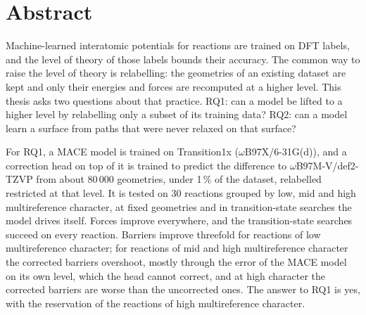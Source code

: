 
\section*{Abstract}

Machine-learned interatomic potentials for reactions are trained on DFT
labels, and the level of theory of those labels bounds their accuracy.
The common way to raise the level of theory is relabelling: the geometries of an
existing dataset are kept and only their energies and forces are
recomputed at a higher level. This thesis asks two questions about
that practice. RQ1: can a model be lifted to a higher level by
relabelling only a subset of its training data? RQ2: can a model learn
a surface from paths that were never relaxed on that surface?

For RQ1, a MACE model is trained on Transition1x
(\mbox{$\omega$B97X/6-31G(d)}), and a correction head on top of it
is trained to predict the difference to \mbox{$\omega$B97M-V/def2-TZVP}
from about 80\,000 geometries, under 1\,\% of the dataset, relabelled
restricted at that level. It is tested on 30 reactions grouped by low, mid and high
multireference character, at fixed geometries and in transition-state
searches the model drives itself. Forces improve everywhere, and the
transition-state searches succeed on every reaction. Barriers improve
threefold for reactions of low multireference character; for reactions
of mid and high multireference character the corrected barriers
overshoot, mostly through the error of the MACE model on its own
level, which the head cannot correct, and at high character the
corrected barriers are worse than the uncorrected ones. The answer to RQ1 is yes, with the reservation of
the reactions of high multireference character.

